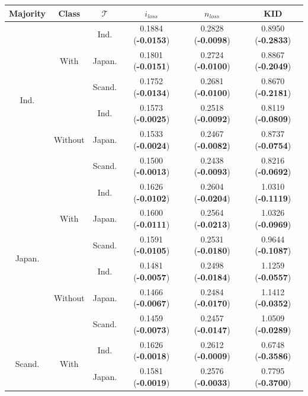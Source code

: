 \begin{table}[]
\centering
\begin{tabular}{c|c|c|c|c|c}
    \textbf{Majority} & \textbf{Class} & \textbf{$\mathcal{T}$} & \textbf{$i_{loss}$} & \textbf{$n_{loss}$} & \textbf{KID} \\
    \toprule
\multirow{6}{*}{Ind.} & \multirow{3}{*}{With} &  Ind.     & 0.1884 (\textbf{-0.0153})       & 0.2828 (\textbf{-0.0098})       & 0.8950 (\textbf{-0.2833}) \\
 &  & Japan.   & 0.1801 (\textbf{-0.0151})       & 0.2724 (\textbf{-0.0100})       & 0.8867 (\textbf{-0.2049})   \\
 &  & Scand. & 0.1752 (\textbf{-0.0134})       & 0.2681 (\textbf{-0.0100})       & 0.8670 (\textbf{-0.2181})  \\
\hhline{~-----}
 & \multirow{3}{*}{Without} & Ind.     & 0.1573 (\textbf{-0.0025})       & 0.2518 (\textbf{-0.0092})       & 0.8119 (\textbf{-0.0809})    \\
 &  & Japan.   & 0.1533 (\textbf{-0.0024})       & 0.2467 (\textbf{-0.0082})       & 0.8737 (\textbf{-0.0754})  \\
 &  & Scand. & 0.1500 (\textbf{-0.0013})       & 0.2438 (\textbf{-0.0093})       & 0.8216 (\textbf{-0.0692})   \\
\midrule
\multirow{6}{*}{Japan.} & \multirow{3}{*}{With} & Ind.     & 0.1626 (\textbf{-0.0102})       & 0.2604 (\textbf{-0.0204})       & 1.0310 (\textbf{-0.1119})   \\
 &  & Japan.   & 0.1600 (\textbf{-0.0111})       & 0.2564 (\textbf{-0.0213})       & 1.0326 (\textbf{-0.0969}) \\
 &  & Scand. & 0.1591 (\textbf{-0.0105})       & 0.2531 (\textbf{-0.0180})       & 0.9644 (\textbf{-0.1087})  \\
\hhline{~-----}
 & \multirow{3}{*}{Without} & Ind.     & 0.1481 (\textbf{-0.0057})       & 0.2498 (\textbf{-0.0184})       & 1.1259 (\textbf{-0.0557})   \\
 &  & Japan.   & 0.1466 (\textbf{-0.0067})       & 0.2484 (\textbf{-0.0170})       & 1.1412 (\textbf{-0.0352})  \\
 &  & Scand. & 0.1459 (\textbf{-0.0073})       & 0.2457 (\textbf{-0.0147})       & 1.0509 (\textbf{-0.0289})      \\
\midrule
\multirow{6}{*}{Scand.} & \multirow{3}{*}{With} & Ind.     & 0.1626 (\textbf{-0.0018})       & 0.2612 (\textbf{-0.0009})       & 0.6748 (\textbf{-0.3586})   \\
 &  & Japan.   & 0.1581 (\textbf{-0.0019})       & 0.2576 (\textbf{-0.0033})       & 0.7795 (\textbf{-0.3700})  \\

\end{tabular}
\end{table}

